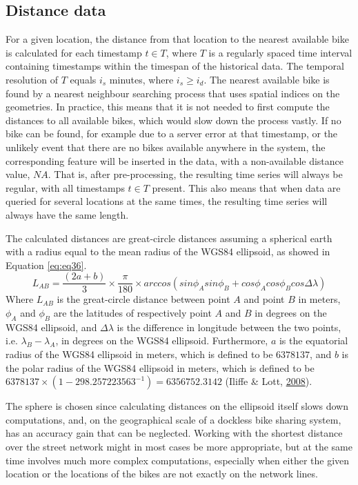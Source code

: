 \documentclass[12pt,oneside]{reedthesis}
\begin{document}
\subsection{Distance data}\label{threefourone}

For a given location, the distance from that location to the nearest
available bike is calculated for each timestamp \(t \in T\), where \(T\)
is a regularly spaced time interval containing timestamps within the
timespan of the historical data. The temporal resolution of \(T\) equals
\(i_{s}\) minutes, where \(i_{s} \geq i_{d}\). The nearest available
bike is found by a nearest neighbour searching process that uses spatial
indices on the geometries. In practice, this means that it is not needed
to first compute the distances to all available bikes, which would slow
down the process vastly. If no bike can be found, for example due to a
server error at that timestamp, or the unlikely event that there are no
bikes available anywhere in the system, the corresponding feature will
be inserted in the data, with a non-available distance value, \(NA\).
That is, after pre-processing, the resulting time series will always be
regular, with all timestamps \(t \in T\) present. This also means that
when data are queried for several locations at the same times, the
resulting time series will always have the same length.

The calculated distances are great-circle distances assuming a spherical
earth with a radius equal to the mean radius of the WGS84 ellipsoid, as
showed in Equation \eqref{eq:eq36}.
\begin{equation}
L_{AB} = \frac{(2a+b)}{3} \times
\frac{\pi}{180} \times
arccos(sin\phi_{A}sin\phi_{B}+cos\phi_{A}cos\phi_{B}cos\Delta\lambda)
\label{eq:eq36}
\end{equation}
Where \(L_{AB}\) is the great-circle distance between point \(A\) and
point \(B\) in meters, \(\phi_{A}\) and \(\phi_{B}\) are the latitudes
of respectively point \(A\) and \(B\) in degrees on the WGS84 ellipsoid,
and \(\Delta\lambda\) is the difference in longitude between the two
points, i.e. \(\lambda_{B}-\lambda_{A}\), in degrees on the WGS84
ellipsoid. Furthermore, \(a\) is the equatorial radius of the WGS84
ellipsoid in meters, which is defined to be \(6378137\), and \(b\) is
the polar radius of the WGS84 ellipsoid in meters, which is defined to
be \(6378137 \times (1 - 298.257 223 563^{-1}) = 6 356 752.3142\)
(Iliffe \& Lott, \protect\hyperlink{ref-iliffe2008}{2008}).

The sphere is chosen since calculating distances on the ellipsoid itself
slows down computations, and, on the geographical scale of a dockless
bike sharing system, has an accuracy gain that can be neglected. Working
with the shortest distance over the street network might in most cases
be more appropriate, but at the same time involves much more complex
computations, especially when either the given location or the locations
of the bikes are not exactly on the network lines.
\end{document}
